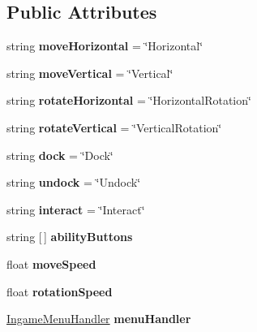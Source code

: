 \subsection*{Public Attributes}
\begin{DoxyCompactItemize}
\item 
\hypertarget{class_player_input_a8df39b968b294624b7d810775c03ab2c}{}\label{class_player_input_a8df39b968b294624b7d810775c03ab2c} 
string {\bfseries move\+Horizontal} = \char`\"{}Horizontal\char`\"{}
\item 
\hypertarget{class_player_input_ae80b2c0fa49c2fbedfb8a39e6f0b0954}{}\label{class_player_input_ae80b2c0fa49c2fbedfb8a39e6f0b0954} 
string {\bfseries move\+Vertical} = \char`\"{}Vertical\char`\"{}
\item 
\hypertarget{class_player_input_aadd82c8c3d8000be9868b331337c332e}{}\label{class_player_input_aadd82c8c3d8000be9868b331337c332e} 
string {\bfseries rotate\+Horizontal} = \char`\"{}Horizontal\+Rotation\char`\"{}
\item 
\hypertarget{class_player_input_a8886c46c6799204fc8641eca2fcae258}{}\label{class_player_input_a8886c46c6799204fc8641eca2fcae258} 
string {\bfseries rotate\+Vertical} = \char`\"{}Vertical\+Rotation\char`\"{}
\item 
\hypertarget{class_player_input_aab5e1a738d5628758c4ca36bde29d31f}{}\label{class_player_input_aab5e1a738d5628758c4ca36bde29d31f} 
string {\bfseries dock} = \char`\"{}Dock\char`\"{}
\item 
\hypertarget{class_player_input_ab60d2e0f5e8e696c13ef34c5bfb0353f}{}\label{class_player_input_ab60d2e0f5e8e696c13ef34c5bfb0353f} 
string {\bfseries undock} = \char`\"{}Undock\char`\"{}
\item 
\hypertarget{class_player_input_a0f97a53f610ac728481465f7b1b476ea}{}\label{class_player_input_a0f97a53f610ac728481465f7b1b476ea} 
string {\bfseries interact} = \char`\"{}Interact\char`\"{}
\item 
\hypertarget{class_player_input_a7b1022ac1c3df0273268869d226386e0}{}\label{class_player_input_a7b1022ac1c3df0273268869d226386e0} 
string \mbox{[}$\,$\mbox{]} {\bfseries ability\+Buttons}
\item 
\hypertarget{class_player_input_a7aa3563a9e426c51b037453a0da69410}{}\label{class_player_input_a7aa3563a9e426c51b037453a0da69410} 
float {\bfseries move\+Speed}
\item 
\hypertarget{class_player_input_aa7dda4401fa456881b35ca7e83db1f75}{}\label{class_player_input_aa7dda4401fa456881b35ca7e83db1f75} 
float {\bfseries rotation\+Speed}
\item 
\hypertarget{class_player_input_a20a8e9966d7d450161e6bf30336f7818}{}\label{class_player_input_a20a8e9966d7d450161e6bf30336f7818} 
\hyperlink{class_ingame_menu_handler}{Ingame\+Menu\+Handler} {\bfseries menu\+Handler}
\end{DoxyCompactItemize}


